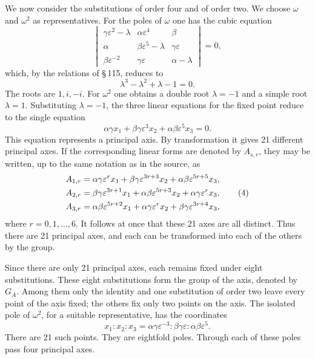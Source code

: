 \documentclass[11pt]{article}
\newcommand{\eps}{\varepsilon}
\begin{document}
We now consider the substitutions of order four and of order two. We choose \(\omega\) and \(\omega^2\) as representatives. For the poles of \(\omega\) one has the cubic equation
\begin{equation}
\begin{vmatrix}
\gamma\eps^2-\lambda&\alpha\eps^4&\beta\\
\alpha&\beta\eps^5-\lambda&\gamma\eps\\
\beta\eps^{-2}&\gamma\eps&\alpha-\lambda
\end{vmatrix}=0,
\tag{1}
\end{equation}
which, by the relations of \S\,115, reduces to
\begin{equation}
\lambda^3-\lambda^2+\lambda-1=0.
\tag{2}
\end{equation}
The roots are \(1,i,-i\). For \(\omega^2\) one obtains a double root \(\lambda=-1\) and a simple root \(\lambda=1\). Substituting \(\lambda=-1\), the three linear equations for the fixed point reduce to the single equation
\begin{equation}
\alpha\gamma x_1+\beta\gamma\eps^3x_2+\alpha\beta\eps^5x_3=0.
\tag{3}
\end{equation}
This equation represents a principal axis. By transformation it gives 21 different principal axes. If the corresponding linear forms are denoted by \(A_{s,r}\), they may be written, up to the same notation as in the source, as
\begin{align}
A_{1,r}&=\alpha\gamma\eps^{r}x_1+\beta\gamma\eps^{3r+3}x_2+\alpha\beta\eps^{5r+5}x_3,\notag\\
A_{2,r}&=\beta\gamma\eps^{3r+1}x_1+\alpha\beta\eps^{5r+3}x_2+\alpha\gamma\eps^{r}x_3,\tag{4}\\
A_{3,r}&=\alpha\beta\eps^{5r+2}x_1+\alpha\gamma\eps^{r}x_2+\beta\gamma\eps^{3r+4}x_3,\notag
\end{align}
where \(r=0,1,\ldots,6\). It follows at once that these 21 axes are all distinct. Thus there are 21 principal axes, and each can be transformed into each of the others by the group.

Since there are only 21 principal axes, each remains fixed under eight substitutions. These eight substitutions form the group of the axis, denoted by \(G_A\). Among them only the identity and one substitution of order two leave every point of the axis fixed; the others fix only two points on the axis. The isolated pole of \(\omega^2\), for a suitable representative, has the coordinates
\begin{equation}
x_1:x_2:x_3=\alpha\gamma\eps^{-3}:\beta\gamma\eps:\alpha\beta\eps^5.
\tag{5}
\end{equation}
There are 21 such points. They are eightfold poles. Through each of these poles pass four principal axes.
\end{document}
